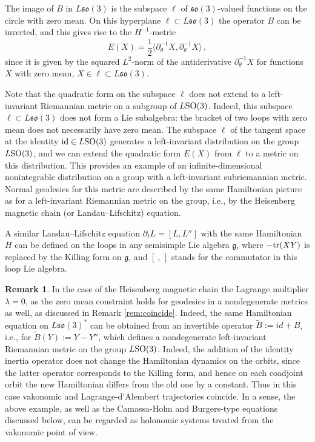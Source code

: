 \documentclass[11pt]{article}
\theoremstyle{definition}
\newtheorem{remark}[lemma]{Remark}
\newcommand{\id}{\mathrm{id}}
\newcounter{ai}
\begin{document}
The image of $B$ in  $L\mathfrak{so}(3)$  is the subspace $\ell$ of
$\mathfrak{so}(3)$-valued functions on the circle with zero mean. 
On this hyperplane $\ell\subset L\mathfrak{so}(3)$ 
the operator $B$ can be inverted, and this gives 
rise to the  $H^{-1}$-metric 
$$ 
E(X)=\frac 12\langle \partial_\theta^{-1}X, \partial_\theta^{-1}X\rangle\,,
$$
since it is given by the squared $L^2$-norm of the antiderivative 
$\partial_\theta^{-1}X$ for functions $X$ with zero mean, $X\in \ell\subset L\mathfrak{so}(3)$.

Note that the quadratic form on the subspace $\ell$
does not extend to a left-invariant Riemannian metric on a subgroup
of  $L{\rm SO}(3)$. Indeed, this subspace 
$\ell\subset L\mathfrak{so}(3)$ does
not form a Lie subalgebra: the bracket of two loops with zero mean
does not necessarily have zero mean. 
The subspace  $\ell$ of the tangent
space at the identity $\id\in L{\rm SO}(3)$ generates a left-invariant 
distribution on the group $L{\rm SO}(3)$, and we can extend the 
quadratic form $E(X)$ from $\ell$ to a metric on this distribution.
This provides an example of an infinite-dimensional nonintegrable distribution
on a group with a left-invariant subriemannian metric. 
Normal geodesics for this metric 
are described by the same Hamiltonian picture as for a 
left-invariant Riemannian metric on the group, i.e., by the 
Heisenberg magnetic chain (or Landau--Lifschitz) equation.

A similar Landau--Lifschitz equation    $\partial_t L = [L, L'']$ 
 with the same Hamiltonian $H$  can be defined on  the loops in any   semisimple Lie algebra $\mathfrak g$, where 
  $-{\rm tr}(XY)$ is replaced by the  Killing   form  on  $\mathfrak g$, and $[~,\,]$ stands for the commutator in this loop Lie algebra. 
 
\begin{remark}
In the case of the Heisenberg magnetic chain the Lagrange multiplier $\lambda=0$, as the zero 
 mean constraint holds for geodesics in a nondegenerate metrics as well, as discussed in Remark \ref{rem:coincide}. Indeed, the same Hamiltonian equation 
 on $L\mathfrak{so}(3)^*$ can be obtained from an invertible operator $\tilde B := id+B$, i.e., 
 for $\tilde B (Y ) := Y-Y''$, which defines a nondegenerate left-invariant Riemannian metric on the group 
 $L{\rm SO}(3)$. Indeed, the addition of the identity inertia operator does not change the Hamiltonian
dynamics on the orbits, since the latter operator corresponds to the Killing form, and hence on each 
 coadjoint orbit the new Hamiltonian differs from the old one by a constant. Thus in this case vakonomic and Lagrange-d'Alembert trajectories coincide.
In a sense, the above example, as well as the Camassa-Holm and Burgers-type equations discussed below, 
can be regarded as holonomic systems treated from the vakonomic point of view. 
\end{remark} 
\end{document}
